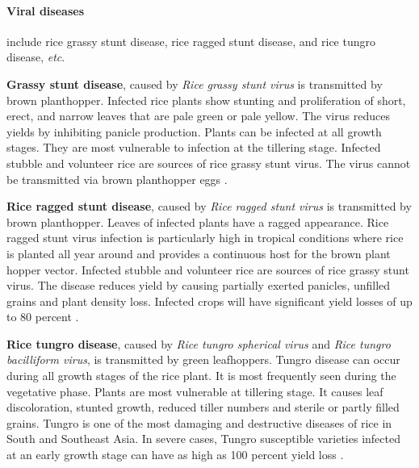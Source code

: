 \documentclass[12pt, oneside]{report}
\begin{document}
\paragraph{Viral diseases} include rice grassy stunt disease, rice ragged stunt disease, and rice tungro disease, \textit{etc}. 

\textbf{Grassy stunt disease}, caused by \textit{Rice grassy stunt virus} is transmitted by brown planthopper. Infected rice plants show stunting and proliferation of short, erect, and narrow leaves that are pale green or pale yellow. The virus reduces yields by inhibiting panicle production. Plants can be infected at all growth stages. They are most vulnerable to infection at the tillering stage. Infected stubble and volunteer rice are sources of rice grassy stunt virus. The virus cannot be transmitted via brown planthopper eggs \citep{ouricedisease, ling1972rice}.

\textbf{Rice ragged stunt disease}, caused by \textit{Rice ragged stunt virus} is transmitted by brown planthopper. Leaves of infected plants have a ragged appearance. Rice ragged stunt virus infection is particularly high in tropical conditions where rice is planted all year around and provides a continuous host for the brown plant hopper vector. Infected stubble and volunteer rice are sources of rice grassy stunt virus. The disease reduces yield by causing partially exerted panicles, unfilled grains and plant density loss. Infected crops will have significant yield losses of up to 80 percent \citep{ling1972rice}.

\textbf{Rice tungro disease}, caused by \textit{Rice tungro spherical virus} and \textit{Rice tungro bacilliform virus}, is transmitted by green leafhoppers. Tungro disease can occur during all growth stages of the rice plant. It is most frequently seen during the vegetative phase. Plants are most vulnerable at tillering stage. It causes leaf discoloration, stunted growth, reduced tiller numbers and sterile or partly filled grains. Tungro is one of the most damaging and destructive diseases of rice in South and Southeast Asia. In severe cases, Tungro susceptible varieties infected at an early growth stage can have as high as 100 percent yield loss \citep{ouricedisease}.
\end{document}
